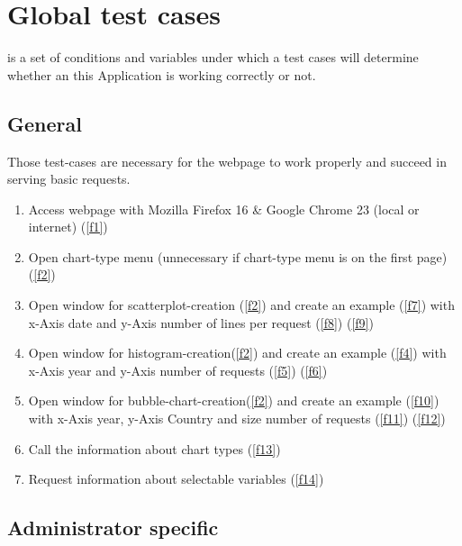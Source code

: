 \section{Global test cases}

is a set of conditions and variables under which a test cases will determine whether an this Application is working correctly 
or not.

\renewcommand{\theenumi}{/T\arabic{enumi}0/}
\renewcommand{\labelenumi}{\theenumi}

\subsection{General}

Those test-cases are necessary for the webpage to work properly and succeed in serving basic requests.

\begin{enumerate}

\item Access webpage with Mozilla Firefox 16 \& 
Google Chrome 23 (local or internet) (\ref{f1})

\item Open chart-type menu (unnecessary if chart-type menu is on the first page) (\ref{f2})

\item Open window for scatterplot-creation (\ref{f2}) and create an example (\ref{f7})
      with x-Axis date and y-Axis number of lines per request (\ref{f8}) (\ref{f9})

\item Open window for histogram-creation(\ref{f2}) and create an example (\ref{f4})
      with x-Axis year and y-Axis number of requests (\ref{f5}) (\ref{f6})

\item Open window for bubble-chart-creation(\ref{f2}) and create an example (\ref{f10})
      with x-Axis year, y-Axis Country and size number of requests (\ref{f11}) (\ref{f12})

\item Call the information about chart types (\ref{f13})

\item Request information about selectable variables (\ref{f14})

\end{enumerate}

\subsection{Administrator specific}

